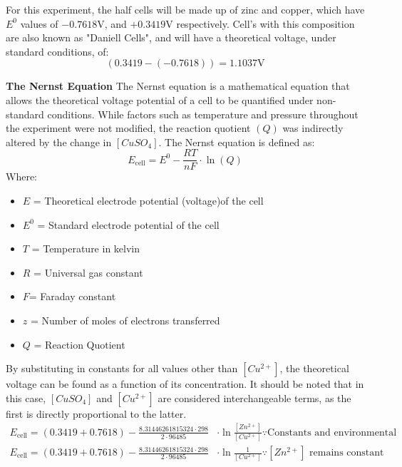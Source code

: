 \documentclass[10.5pt,a4paper]{article}
\begin{document}
	For this experiment, the half cells will be made up of zinc and copper, which have $E^0$ values of $-0.7618$V, and $+0.3419$V respectively. Cell's with this composition are also known as "Daniell Cells", and will have a theoretical voltage, under standard conditions, of: 
	$$(0.3419-(-0.7618))=1.1037\textrm{V}$$
	
	\cite{StandardElectrodePotentialsCite}

	\textbf{The Nernst Equation}\newline
	The Nernst equation is a mathematical equation that allows the theoretical voltage potential of a cell to be quantified under non-standard conditions. While factors such as temperature and pressure throughout the experiment were not modified, the reaction quotient $(Q)$ was indirectly altered by the change in $[CuSO_4]$. 
\newline The Nernst equation is defined as:
	$$
	E_{\textrm{cell}}=E^0 - \frac{RT}{nF}\cdot \ln(Q)
	$$
	Where:
	\begin{itemize}
		\item $E$ = Theoretical electrode potential (voltage)of the cell
		\item $E^0$ = Standard electrode potential of the cell
		\item $T$ = Temperature in kelvin 
		\item $R$ = Universal gas constant
		\item $F$= Faraday constant
		\item $z$ = Number of moles of electrons transferred
		\item $Q$ = Reaction Quotient
		
\cite{NernstEquationCite}
	\end{itemize}
By substituting in constants for all values other than $[Cu^{2+}]$, the theoretical voltage can be found as a function of its concentration.  It should be noted that in this case, ${[CuSO_4]}$ and $[Cu^{2+}]$ are considered interchangeable terms, as the first is directly proportional to the latter.
\begin{align*}
E_{\textrm{cell}}=(0.3419+0.7618)-\frac{8.31446261815324\cdot298}{2\cdot96485}&\cdot\ln\frac{[Zn^{2+}]}{[Cu^{2+}]}\because \textrm{Constants and environmental conditions}\\
E_{\textrm{cell}}=(0.3419+0.7618)-\frac{8.31446261815324\cdot298}{2\cdot96485}&\cdot\ln\frac{1}{[Cu^{2+}]} \because [Zn^{2+}]\textrm{ remains constant}
\end{align*}
\end{document}
